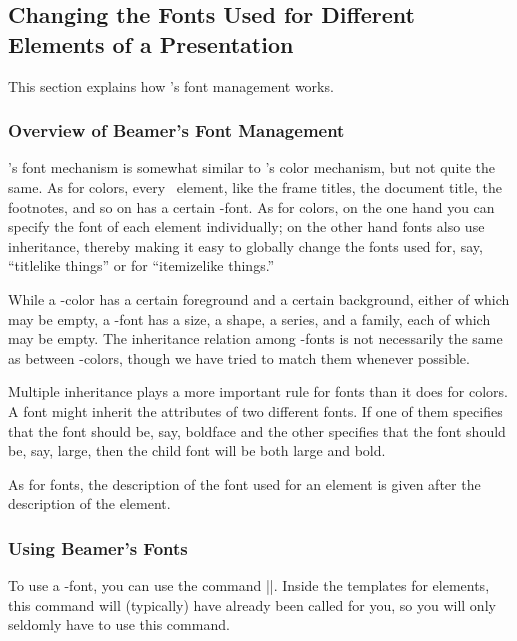\subsection{Changing the Fonts Used for Different Elements of a Presentation}

This section explains how \beamer's font management works.

\subsubsection{Overview of Beamer's Font Management}

\beamer's font mechanism is somewhat similar to \beamer's color mechanism, but not quite the same. As for colors, every \beamer\ element, like the frame titles, the document title, the footnotes, and so on has a certain \beamer-font. As for colors, on the one hand you can specify the font of each element individually; on the other hand fonts also use inheritance, thereby making it easy to globally change the fonts used for, say, ``titlelike things'' or for ``itemizelike things.''

While a \beamer-color has a certain foreground and a certain background, either of which may be empty, a \beamer-font has a size, a shape, a series, and a family, each of which may be empty. The inheritance relation among \beamer-fonts is not necessarily the same as between \beamer-colors, though we have tried to match them whenever possible.

Multiple inheritance plays a more important rule for fonts than it does for colors. A font might inherit the attributes of two different fonts. If one of them specifies that the font should be, say, boldface and the other specifies that the font should be, say, large, then the child font will be both large and bold.

As for fonts, the description of the font used for an element is given after the description of the element.


\subsubsection{Using Beamer's Fonts}

To use a \beamer-font, you can use the command |\usebeamerfont|. Inside the templates for elements, this command will (typically) have already been called for you, so you will only seldomly have to use this command.

